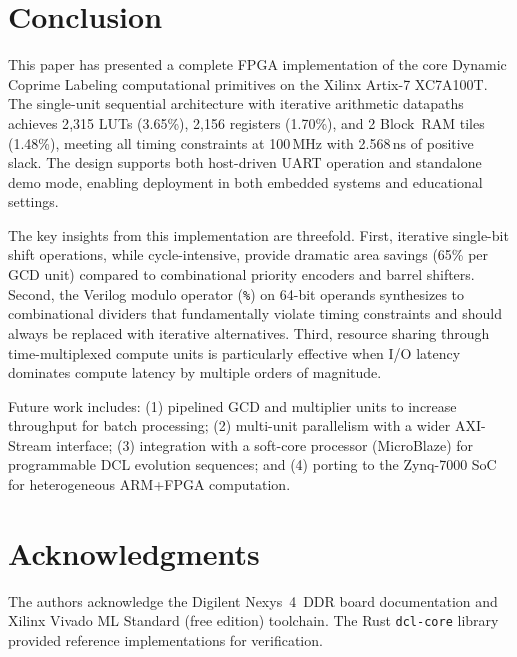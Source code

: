 \documentclass[lettersize,journal]{IEEEtran}
\begin{document}
\section{Conclusion}
\label{sec:conclusion}

This paper has presented a complete FPGA implementation of the core Dynamic Coprime Labeling computational primitives on the Xilinx Artix-7 XC7A100T. The single-unit sequential architecture with iterative arithmetic datapaths achieves 2{,}315 LUTs (3.65\%), 2{,}156 registers (1.70\%), and 2 Block~RAM tiles (1.48\%), meeting all timing constraints at 100\,MHz with 2.568\,ns of positive slack. The design supports both host-driven UART operation and standalone demo mode, enabling deployment in both embedded systems and educational settings.

The key insights from this implementation are threefold. First, iterative single-bit shift operations, while cycle-intensive, provide dramatic area savings (65\% per GCD unit) compared to combinational priority encoders and barrel shifters. Second, the Verilog modulo operator (\texttt{\%}) on 64-bit operands synthesizes to combinational dividers that fundamentally violate timing constraints and should always be replaced with iterative alternatives. Third, resource sharing through time-multiplexed compute units is particularly effective when I/O latency dominates compute latency by multiple orders of magnitude.

Future work includes: (1) pipelined GCD and multiplier units to increase throughput for batch processing; (2) multi-unit parallelism with a wider AXI-Stream interface; (3) integration with a soft-core processor (MicroBlaze) for programmable DCL evolution sequences; and (4) porting to the Zynq-7000 SoC for heterogeneous ARM+FPGA computation.

\section*{Acknowledgments}

The authors acknowledge the Digilent Nexys~4~DDR board documentation and Xilinx Vivado ML Standard (free edition) toolchain. The Rust \texttt{dcl-core} library provided reference implementations for verification.
\end{document}
